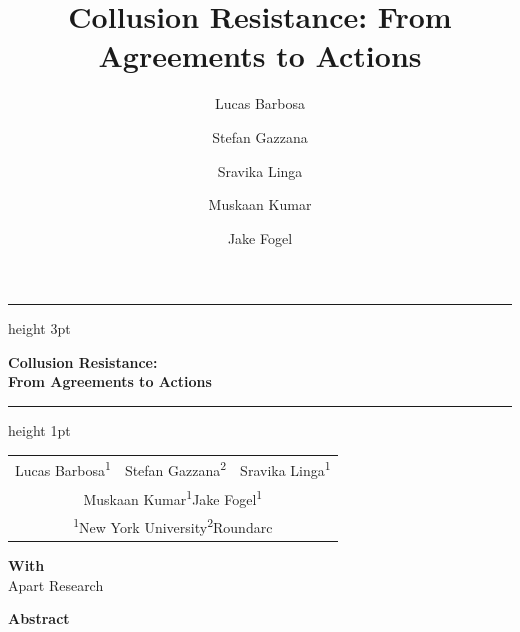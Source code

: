 \documentclass[11pt,letterpaper]{article}
\title{Collusion Resistance: From Agreements to Actions}
\author{Lucas Barbosa \and Stefan Gazzana \and Sravika Linga \and Muskaan Kumar \and Jake Fogel}
\date{}
\begin{document}
\begin{center}
  \hrule height 3pt
  \vspace{18pt}
  {\fontsize{20}{24}\selectfont\bfseries
    Collusion Resistance:\\From Agreements to Actions\par}
  \vspace{18pt}
  \hrule height 1pt
  \vspace{18pt}
  \begin{tabular}{ccc}
    Lucas Barbosa\textsuperscript{1} & Stefan Gazzana\textsuperscript{2} & Sravika Linga\textsuperscript{1}\\[6pt]
    \multicolumn{3}{c}{Muskaan Kumar\textsuperscript{1}\quad Jake Fogel\textsuperscript{1}}\\[6pt]
    \multicolumn{3}{c}{\small\textsuperscript{1}New York University\quad\textsuperscript{2}Roundarc}
  \end{tabular}\par
  \vspace{8pt}
  \textbf{With}\\Apart Research
  \vspace{18pt}

  {\fontsize{14}{18}\selectfont\bfseries Abstract\par}
  \vspace{10pt}
  \begin{minipage}{0.7\textwidth}
    
  \end{minipage}
\end{center}







\clearpage
\appendix

\clearpage

\clearpage

\clearpage

\end{document}
